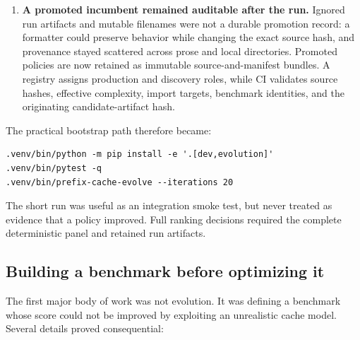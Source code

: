 \documentclass[11pt]{article}
\begin{document}
\begin{enumerate}
  \item \textbf{A promoted incumbent remained auditable after the run.}  Ignored run
  artifacts and mutable filenames were not a durable promotion record: a formatter
  could preserve behavior while changing the exact source hash, and provenance stayed
  scattered across prose and local directories.  Promoted policies are now retained as
  immutable source-and-manifest bundles.  A registry assigns production and discovery
  roles, while CI validates source hashes, effective complexity, import targets,
  benchmark identities, and the originating candidate-artifact hash.
\end{enumerate}

The practical bootstrap path therefore became:

\begin{lstlisting}[style=shell]
.venv/bin/python -m pip install -e '.[dev,evolution]'
.venv/bin/pytest -q
.venv/bin/prefix-cache-evolve --iterations 20
\end{lstlisting}

The short run was useful as an integration smoke test, but never treated as evidence
that a policy improved.  Full ranking decisions required the complete deterministic
panel and retained run artifacts.

\subsection{Building a benchmark before optimizing it}

The first major body of work was not evolution.  It was defining a benchmark whose
score could not be improved by exploiting an unrealistic cache model.  Several
details proved consequential:
\end{document}
